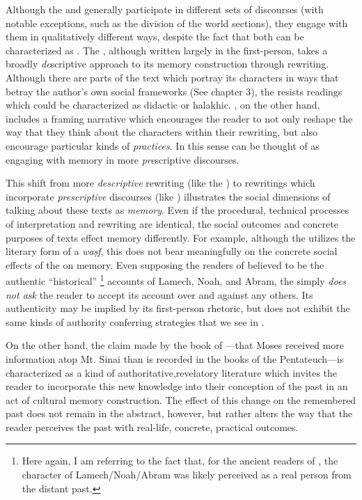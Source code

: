 
Although the \ga and \jub generally participate in different sets of discourses (with notable exceptions, such as the division of the world sections), they engage with them in qualitatively different ways, despite the fact that both can be characterized as \psa. The \ga, although written largely in the first-person, takes a broadly \emph{de}scriptive approach to its memory construction through rewriting. Although there are parts of the text which portray its characters in ways that betray the author's own social frameworks (See chapter 3), the \ga resists readings which could be characterized as didactic or halakhic. \jub, on the other hand, includes a framing narrative which encourages the reader to not only reshape the way that they think about the characters within their rewriting, but also encourage particular kinds of \emph{practices}. In this sense \jub can be thought of as engaging with memory in more \emph{pre}scriptive discourses.

This shift from more \emph{descriptive} rewriting (like the \ga) to rewritings which incorporate \emph{prescriptive} discourses (like \jub) illustrates the social dimensions of talking about these texts as \emph{memory}. Even if the procedural, technical processes of interpretation and rewriting are identical, the social outcomes and concrete purposes of texts effect memory differently. For example, although the \ga utilizes the literary form of a \emph{waṣf}, this does not bear meaningfully on the concrete social effects of the \ga on memory. Even supposing the readers of \ga believed \ga to be the authentic ``historical''%
    \footnote{Here again, I am referring to the fact that, for the ancient readers of \jub, the character of Lamech/Noah/Abram was likely perceived as a real person from the distant past.}
accounts of Lamech, Noah, and Abram, the \ga simply \emph{does not ask} the reader to accept its account over and against any others. Its authenticity may be implied by its first-person rhetoric, but \ga does not exhibit the same kinds of authority conferring strategies that we see in \jub. 

On the other hand, the claim made by the book of \jub---that Moses received more information atop Mt. Sinai than is recorded in the books of the Pentateuch---is characterized as a kind of authoritative,revelatory literature which invites the reader to incorporate this new knowledge into their conception of the past in an act of cultural memory construction. The effect of this change on the remembered past does not remain in the abstract, however, but rather alters the way that the reader perceives the past with real-life, concrete, practical outcomes. 
